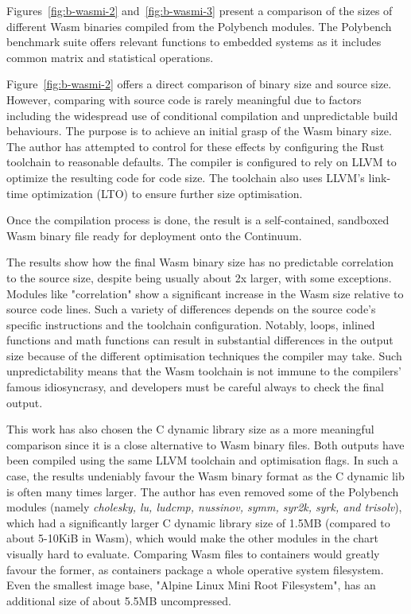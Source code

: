 Figures~\ref{fig:b-wasmi-2} and~\ref{fig:b-wasmi-3} present a comparison of the sizes of different Wasm binaries compiled from the Polybench \cite{yuki2014understanding} modules. The Polybench benchmark suite offers relevant functions to embedded systems as it includes common matrix and statistical operations.

Figure~\ref{fig:b-wasmi-2} offers a direct comparison of binary size and source size. However, comparing with source code is rarely meaningful due to factors including the widespread use of conditional compilation and unpredictable build behaviours. The purpose is to achieve an initial grasp of the Wasm binary size. The author has attempted to control for these effects by configuring the Rust toolchain to reasonable defaults. The compiler is configured to rely on LLVM to optimize the resulting code for code size. The toolchain also uses LLVM's link-time optimization (LTO) to ensure further size optimisation.

Once the compilation process is done, the result is a self-contained, sandboxed Wasm binary file ready for deployment onto the Continuum.

The results show how the final Wasm binary size has no predictable correlation to the source size, despite being usually about 2x larger, with some exceptions. Modules like "correlation" show a significant increase in the Wasm size relative to source code lines. Such a variety of differences depends on the source code's specific instructions and the toolchain configuration. Notably, loops, inlined functions and math functions can result in substantial differences in the output size because of the different optimisation techniques the compiler may take. Such unpredictability means that the Wasm toolchain is not immune to the compilers' famous idiosyncrasy, and developers must be careful always to check the final output.

This work has also chosen the C dynamic library size as a more meaningful comparison since it is a close alternative to Wasm binary files. Both outputs have been compiled using the same LLVM toolchain and optimisation flags. In such a case, the results undeniably favour the Wasm binary format as the C dynamic lib is often many times larger. The author has even removed some of the Polybench modules (namely \emph{cholesky, lu, ludcmp, nussinov, symm, syr2k, syrk, and trisolv}), which had a significantly larger C dynamic library size of 1.5MB (compared to about 5-10KiB in Wasm), which would make the other modules in the chart visually hard to evaluate. Comparing Wasm files to containers would greatly favour the former, as containers package a whole operative system filesystem. Even the smallest image base, "Alpine Linux Mini Root Filesystem", has an additional size of about 5.5MB uncompressed.

